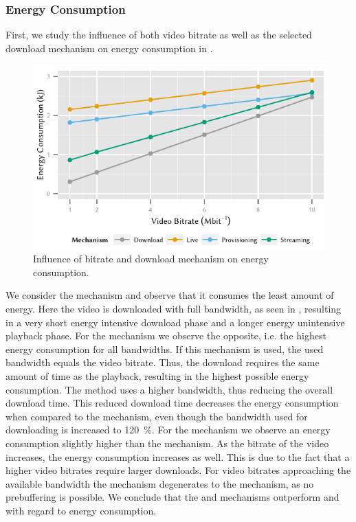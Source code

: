 \subsubsection*{Energy Consumption}\label{sec:application:lte_video:numerical_evaluation:energy_consumption}
First, we study the influence of both video bitrate as well as the selected download mechanism on energy consumption in .
\begin{figure}
  \centering
  \includegraphics{application/lte_video/numerical_evaluation/figures/bitrate2energy}
  \caption{Influence of bitrate and download mechanism on energy consumption.}
  \label{fig:application:lte_video:numerical_evaluation:energy_consumption:bitrate2energy}
\end{figure}

We consider the \download mechanism and observe that it consumes the least amount of energy.
Here the video is downloaded with full bandwidth, as seen in , resulting in a very short energy intensive download phase and a longer energy unintensive playback phase.
For the \live mechanism we observe the opposite, i.e. the highest energy consumption for all bandwidths.
If this mechanism is used, the used bandwidth equals the video bitrate.
Thus, the download requires the same amount of time as the playback, resulting in the highest possible energy consumption.
The \serviceprovisioning method uses a higher bandwidth, thus reducing the overall download time.
This reduced download time decreases the energy consumption when compared to the \live mechanism, even though the bandwidth used for downloading is increased to \SI{120}{\percent}.
For the \streaming mechanism we observe an energy consumption slightly higher than the \download mechanism.
As the bitrate of the video increases, the energy consumption increases as well.
This is due to the fact that a higher video bitrates require larger downloads.
For video bitrates approaching the available bandwidth the \streaming mechanism degenerates to the \live mechanism, as no prebuffering is possible.
We conclude that the \download and \streaming mechanisms outperform \live and \serviceprovisioning with regard to energy consumption.

